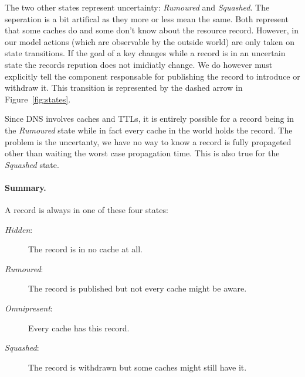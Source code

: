 \documentclass[twoside,english, a4paper]{article}
\newcommand{\powerset}{\mathopen{\mathbb{P}}\ensuremath{\,}}
\begin{document}
The two other states represent uncertainty: \emph{Rumoured} and \emph
{Squashed}. The seperation is a bit artifical as they more or less 
mean the same. Both represent that some caches do and some don't 
know about the resource record. However, in our model actions (which 
are observable by the outside world) are only taken on state 
transitions. If the goal of a key changes while a record is in an 
uncertain state the records repution does not imidiatly change. We 
do however must explicitly tell the component responsable for 
publishing the record to introduce or withdraw it. This transition 
is represented by the dashed arrow in Figure~\ref{fig:states}.

Since DNS involves caches and TTLs, it is entirely possible for a 
record being in the \emph{Rumoured} state while in fact every cache 
in the world holds the record. The problem is the uncertanty, we have
no way to know a record is fully propageted other than waiting the
worst case propagation time. This is also true for the \emph{Squashed}
state.

\paragraph{Summary.} A record is always in one of these four states:

\begin{description}
       \item[\emph{Hidden}:] 		
			The record is in no cache at all.
       \item[\emph{Rumoured}:] 		
			The record is published but not every cache might be aware.
       \item[\emph{Omnipresent}:]
			Every cache has this record.
       \item[\emph{Squashed}:]
			The record is withdrawn but some caches might still have it.
\end{description} 



\end{document}
